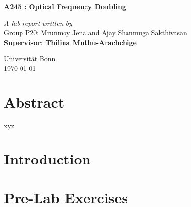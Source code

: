 \documentclass[a4paper]{report}
\begin{document}
\begin{onehalfspace}
\vspace*{0.5in}
\begin{center}
\begin{LARGE}
\textbf{A245 : Optical Frequency Doubling}\\ 
\end{LARGE}
\bigskip
\bigskip
\textit{A lab report written by}\\
Group P20: Mrunmoy Jena and Ajay Shanmuga Sakthivasan\\
\medskip
\textbf{Supervisor: Thilina Muthu-Arachchige}\\
\vspace*{5in}
\begin{flushright}
Universit\"{a}t	Bonn\\
\today
\end{flushright}
\end{center}
\tableofcontents
\chapter*{Abstract}
xyz
\chapter*{Introduction}
%
\chapter*{Pre-Lab Exercises}
%
%
%
%

\end{onehalfspace}
\printbibliography
\end{document}
